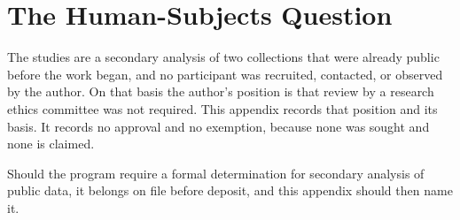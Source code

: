 
\chapter{The Human-Subjects Question}
\label{apx:human-subjects}

The studies are a secondary analysis of two collections that were already public before
the work began, and no participant was recruited, contacted, or observed by the author.
On that basis the author's position is that review by a research ethics committee was
not required. This appendix records that position and its basis. It records no approval
and no exemption, because none was sought and none is claimed.

Should the program require a formal determination for
secondary analysis of public data, it belongs on file before deposit, and this appendix
should then name it.
